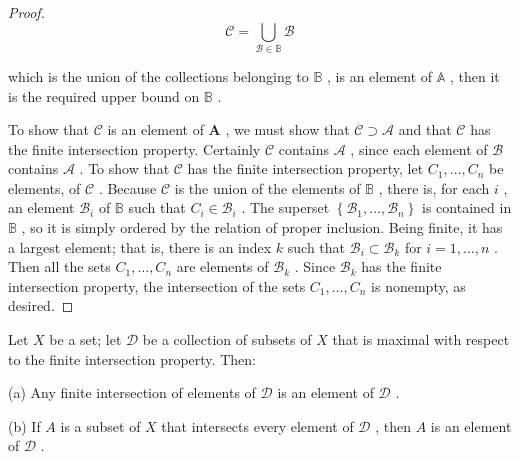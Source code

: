 \begin{proof}
\[
\mathcal{C} = \mathop{\bigcup }\limits_{{\mathcal{B} \in  \mathbb{B}}}\mathcal{B}
\]

which is the union of the collections belonging to \(\mathbb{B}\) , is an element of \(\mathbb{A}\) , then it is the required upper bound on \(\mathbb{B}\) .

To show that \(\mathcal{C}\) is an element of \(\mathbf{A}\) , we must show that \(\mathcal{C} \supset  \mathcal{A}\) and that \(\mathcal{C}\) has the finite intersection property. Certainly \(\mathcal{C}\) contains \(\mathcal{A}\) , since each element of \(\mathcal{B}\) contains \(\mathcal{A}\) . To show that \(\mathcal{C}\) has the finite intersection property, let \({C}_{1},\ldots ,{C}_{n}\) be elements, of \(\mathcal{C}\) . Because \(\mathcal{C}\) is the union of the elements of \(\mathbb{B}\) , there is, for each \(i\) , an element \({\mathcal{B}}_{i}\) of \(\mathbb{B}\) such that \({C}_{i} \in  {\mathcal{B}}_{i}\) . The superset \(\left\{  {{\mathcal{B}}_{1},\ldots ,{\mathcal{B}}_{n}}\right\}\) is contained in \(\mathbb{B}\) , so it is simply ordered by the relation of proper inclusion. Being finite, it has a largest element; that is, there is an index \(k\) such that \({\mathcal{B}}_{i} \subset  {\mathcal{B}}_{k}\) for \(i = 1,\ldots ,n\) . Then all the sets \({C}_{1},\ldots ,{C}_{n}\) are elements of \({\mathcal{B}}_{k}\) . Since \({\mathcal{B}}_{k}\) has the finite intersection property, the intersection of the sets \({C}_{1},\ldots ,{C}_{n}\) is nonempty, as desired.
\end{proof}
\begin{lemma} Let \(X\) be a set; let \(\mathcal{D}\) be a collection of subsets of \(X\) that is maximal with respect to the finite intersection property. Then:

(a) Any finite intersection of elements of \(\mathcal{D}\) is an element of \(\mathcal{D}\) .

(b) If \(A\) is a subset of \(X\) that intersects every element of \(\mathcal{D}\) , then \(A\) is an element of \(\mathcal{D}\) .
\end{lemma}

